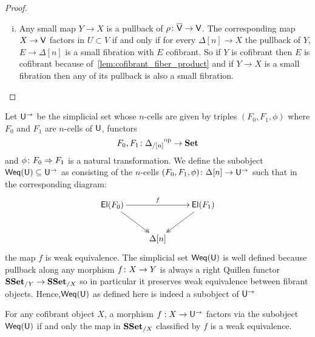 \documentclass[reqno,10pt,a4paper,oneside,draft]{amsart}
\begin{document}
\begin{proof}
\begin{enumerate}[(i)]
\item Any small map $Y \rightarrow X$ is a pullback of $\rho \colon \overline{\mathsf{V}} \rightarrow \mathsf{V}$. The corresponding map $X \rightarrow \mathsf{V}$ factors in $U \subset V$ if and only if for every $\Delta[n] \rightarrow X$ the pullback of $Y$, $E \rightarrow \Delta[n]$ is a small fibration with $E$ cofibrant. So if $Y$ is cofibrant then $E$ is cofibrant because of~\cref{lem:cofibrant_fiber_product} and if $Y \rightarrow X$ is a small fibration then any of its pullback is also a small fibration.  \qedhere
\end{enumerate}
\end{proof} 








 Let $\mathsf{U}^{\rightarrow}$ be the simplicial set whose $n$-cells are given by triples $(F_0, F_1, \phi)$ where
 $F_0$ and $F_1$ are $n$-cells of $\mathsf{U}$, \ie functors
 \[
F_0, F_1 \colon {\Delta_{/[n]}}^{\operatorname{op}} \rightarrow \mathbf{Set}
\]
and $\phi \colon F_0 \Rightarrow F_1$ is a natural transformation. We define the subobject $\mathsf{Weq}(\mathsf{U}) \subseteq \mathsf{U}^{\rightarrow}$ as consisting of the 
$n$-cells $(F_0, F_1, \phi) \colon \Delta[n] \rightarrow \mathsf{U}^{\rightarrow}$ such that in the corresponding diagram:
\[
\xymatrix{ 
\mathsf{El}(F_0) \ar[rr]^{f} \ar@{->>}[dr] & & \mathsf{El}(F_1) \ar@{->>}[dl] \\
& \Delta[n] & }
\]
the map $f$ is weak equivalence. The simplicial set $\mathsf{Weq}(\mathsf{U})$ is well defined because pullback along any morphism $f \colon X \rightarrow Y$ is always a right Quillen functor $\mathbf{SSet}_{/Y} \rightarrow \mathbf{SSet}_{/X}$ so in particular it preserves weak equivalence between fibrant objects. Hence,$\mathsf{Weq}(\mathsf{U})$ as defined here is indeed a subobject of $\mathsf{U}^{\rightarrow}$

\begin{proposition}
\label{prop:Weq_classify_Weq}
For any cofibrant object $X$, a morphism $f:X \rightarrow \mathsf{U}^{\rightarrow}$ factors via the subobject $\mathsf{Weq}(\mathsf{U})$ if and only the map in $\mathbf{SSet}_{/X}$ classified by $f$ is a weak equivalence.

\end{proposition}
\end{document}
